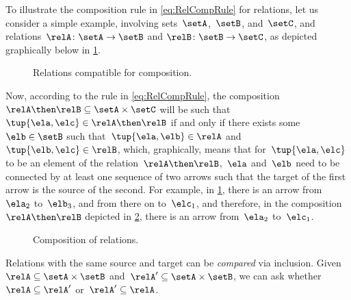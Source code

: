 To illustrate the composition rule in \cref{eq:RelCompRule} for relations, let us consider a simple example, involving sets~$\setA$,~$\setB$, and~$\setC$, and relations~$\relA \colon \setA \to \setB$ and $\relB \colon \setB \to \setC$, as depicted graphically below in \cref{fig:example_rel_composable}.
%
\begin{figure}[h!]
    \centering
    \caption{Relations compatible for composition.}
    \label{fig:example_rel_composable}
\end{figure}
%
Now, according to the rule in \cref{eq:RelCompRule}, the composition~$\relA \then \relB \subseteq \setA \times \setC$ will be such that~$\tup{\ela,\elc} \in \relA \then \relB$ if and only if there exists some~$\elb \in \setB$ such that~$\tup{\ela,\elb} \in \relA$ and~$\tup{\elb,\elc} \in \relB$, which, graphically, means that for~$\tup{\ela,\elc}$ to be an element of the relation~$\relA \then \relB$,~$\ela$ and~$\elb$ need to be connected by at least one sequence of two arrows such that the target of the first arrow is the source of the second.
For example, in \cref{fig:example_rel_composable}, there is an arrow from~$\ela_2$ to~$\elb_3$, and from there on to~$\elc_1$, and therefore, in the composition~$\relA \then \relB$ depicted in \cref{fig:example_rel_composed}, there is an arrow from~$\ela_2$ to~$\elc_1$.
%
\begin{figure}[h!]
    \centering
    \caption{Composition of relations.}
    \label{fig:example_rel_composed}
\end{figure}

\begin{remark}
    Relations with the same source and target can be \emph{compared} via inclusion.
    Given~$\relA \subseteq \setA\times \setB$ and~$\relA'\subseteq \setA\times \setB$, we can ask whether~$\relA\subseteq \relA'$ or~$\relA'\subseteq \relA$.
\end{remark}
